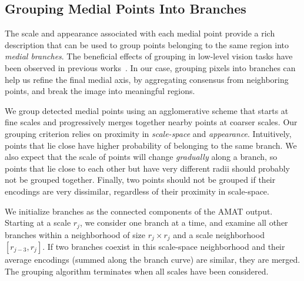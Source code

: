 \documentclass[10pt,twocolumn,letterpaper]{article}
\begin{document}
\subsection{Grouping Medial Points Into Branches}\label{sec:method:grouping}
The scale and appearance associated with each medial point provide a rich
description that can be used to group points belonging to the same region into \emph{medial branches}.
The beneficial effects of grouping in low-level vision tasks have been
observed in previous works~\cite{felzenszwalb2006min,zhu2007untangling,kokkinos2010highly,qi2015making}.
In our case, grouping pixels into branches can help us refine the final medial axis, 
by aggregating consensus from neighboring points, and break the image into meaningful regions.

We group detected medial points using an agglomerative scheme that starts at fine scales and
progressively merges together nearby points at coarser scales.
Our grouping criterion relies on proximity in \emph{scale-space} and \emph{appearance}.
Intuitively, points that lie close have higher probability of belonging to the same branch.
We also expect that the scale of points will change \emph{gradually} along a branch,
so points that lie close to each other but have very different radii should probably not be grouped together.
Finally, two points should not be grouped if their encodings are very dissimilar,
regardless of their proximity in scale-space. 

We initialize branches as the connected components of the AMAT output.
Starting at a scale $r_j$, we consider one branch at a time, and examine all other
branches within a neighborhood of size $r_j \times r_j$ and a scale neighborhood $[r_{j-3},r_j]$.
If two branches coexist in this scale-space neighborhood and their average encodings 
(summed along the branch curve) are similar, they are merged.
The grouping algorithm terminates when all scales have been considered.

\end{document}
